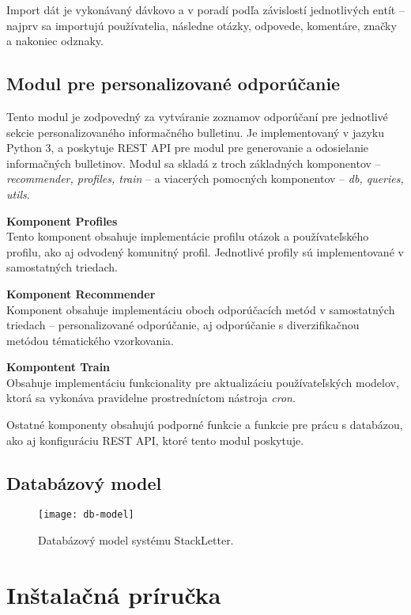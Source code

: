 Import dát je vykonávaný dávkovo a v poradí podľa závislostí jednotlivých entít -- najprv sa importujú používatelia,
následne otázky, odpovede, komentáre, značky a nakoniec odznaky.


\section{Modul pre personalizované odporúčanie}
Tento modul je zodpovedný za vytváranie zoznamov odporúčaní pre jednotlivé sekcie personalizovaného informačného bulletinu.
Je implementovaný v jazyku Python 3, a poskytuje REST API pre modul pre generovanie a odosielanie informačných bulletinov.
Modul sa skladá z troch základných komponentov -- \textit{recommender, profiles, train} -- a viacerých pomocných komponentov
-- \textit{db, queries, utils}.

\textbf{Komponent Profiles}\\
Tento komponent obsahuje implementácie profilu otázok a používateľského profilu, ako aj odvodený komunitný profil.
Jednotlivé profily sú implementované v samostatných triedach.

\textbf{Komponent Recommender}\\
Komponent obsahuje implementáciu oboch odporúčacích metód v samostatných triedach -- personalizované odporúčanie,
aj odporúčanie s diverzifikačnou metódou tématického vzorkovania.

\textbf{Kompontent Train}\\
Obsahuje implementáciu funkcionality pre aktualizáciu používateľských modelov, ktorá sa vykonáva pravidelne prostredníctom
nástroja \textit{cron}.

Ostatné komponenty obsahujú podporné funkcie a funkcie pre prácu s databázou, ako aj konfiguráciu REST API, ktoré tento
modul poskytuje.

\section{Databázový model}\label{apx:dbmodel}
\begin{figure}[H]\begin{center}
\texttt{[image: db-model]}
\caption{Databázový model systému StackLetter.\label{fig:db-model}}\end{center}
\end{figure}

\afterpage{\blankpage}
\newpage
\chapter{Inštalačná príručka}

